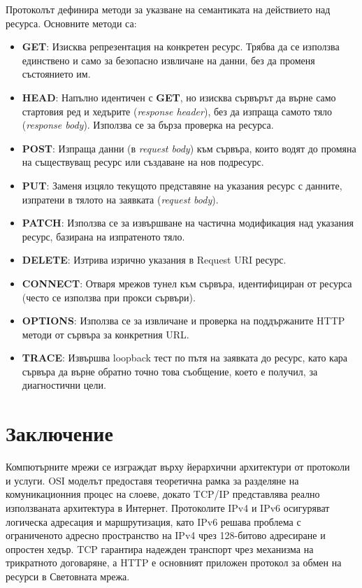 \documentclass{scrartcl}
\begin{document}
\begin{FlushLeft}
Протоколът дефинира методи за указване на семантиката на действието над ресурса. Основните методи са:
\begin{itemize}
    \item \textbf{GET}: Изисква репрезентация на конкретен ресурс. Трябва да се използва единствено и само за безопасно извличане на данни, без да променя състоянието им.
    \item \textbf{HEAD}: Напълно идентичен с \textbf{GET}, но изисква сървърът да върне само стартовия ред и хедърите (\textit{response header}), без да изпраща самото тяло (\textit{response body}). Използва се за бърза проверка на ресурса.
    \item \textbf{POST}: Изпраща данни (в \textit{request body}) към сървъра, които водят до промяна на съществуващ ресурс или създаване на нов подресурс.
    \item \textbf{PUT}: Заменя изцяло текущото представяне на указания ресурс с данните, изпратени в тялото на заявката (\textit{request body}).
    \item \textbf{PATCH}: Използва се за извършване на частична модификация над указания ресурс, базирана на изпратеното тяло.
    \item \textbf{DELETE}: Изтрива изрично указания в Request URI ресурс.
    \item \textbf{CONNECT}: Отваря мрежов тунел към сървъра, идентифициран от ресурса (често се използва при прокси сървъри).
    \item \textbf{OPTIONS}: Използва се за извличане и проверка на поддържаните HTTP методи от сървъра за конкретния URL.
    \item \textbf{TRACE}: Извършва loopback тест по пътя на заявката до ресурс, като кара сървъра да върне обратно точно това съобщение, което е получил, за диагностични цели.
\end{itemize}

\section*{Заключение}
Компютърните мрежи се изграждат върху йерархични архитектури от протоколи и услуги. OSI моделът предоставя теоретична рамка за разделяне на комуникационния процес на слоеве, докато TCP/IP представлява реално използваната архитектура в Интернет. Протоколите IPv4 и IPv6 осигуряват логическа адресация и маршрутизация, като IPv6 решава проблема с ограниченото адресно пространство на IPv4 чрез 128-битово адресиране и опростен хедър. TCP гарантира надежден транспорт чрез механизма на трикратното договаряне, а HTTP е основният приложен протокол за обмен на ресурси в Световната мрежа.

\end{FlushLeft}
\end{document}
